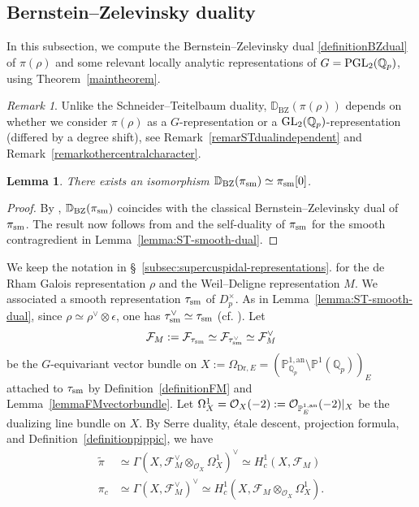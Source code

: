 \documentclass[a4paper,10pt]{amsart}
\theoremstyle{remark}
\newtheorem{remark}[theorem]{Remark}
\theoremstyle{definition}
\theoremstyle{plain}
\newtheorem{lemma}[theorem]{Lemma}
\numberwithin{equation}{section}
\newcommand{\bbD}{{\mathbb D}}
\newcommand{\bbP}{{\mathbb P}}
\newcommand{\bbQ}{{\mathbb Q}}
\newcommand{\calF}{{\mathcal F}}
\newcommand{\calO}{{\mathcal O}}
\newcommand{\an}{{\rm an}}
\newcommand{\GL}{{\rm GL}}
\newcommand{\PGL}{{\rm PGL}}
\newcommand{\sm}{{\rm sm}}
\newcommand{\BZ}{\ensuremath{\mathrm{BZ}}}
\begin{document}
\subsection{Bernstein--Zelevinsky duality}\label{subsectionBZdual}
In this subsection, we compute the Bernstein--Zelevinsky dual \eqref{definitionBZdual} of $\pi(\rho)$ and some relevant locally analytic representations of $G=\PGL_2(\bbQ_p)$, using Theorem~\ref{maintheorem}.
\begin{remark}
	Unlike the Schneider--Teitelbaum duality, $\bbD_{\BZ}(\pi(\rho))$ depends on whether we consider $\pi(\rho)$ as a $G$-representation or a $\GL_2(\bbQ_p)$-representation (differed by a degree shift), see Remark~\ref{remarSTdualindependent} and Remark~\ref{remarkothercentralcharacter}. 
\end{remark}
\begin{lemma}\label{lem:BZ-smooth}
There exists an isomorphism $\bbD_{\BZ}(\pi_{\sm})\simeq\pi_{\sm}[0]$.
\end{lemma}
\begin{proof}
By \cite[Rem.~5.5]{strauch2025bernsteinzelevinskydualitylocallyanalytic}, $\bbD_{\BZ}(\pi_{\sm})$ coincides with the classical Bernstein--Zelevinsky dual of $\pi_{\sm}$. The result now follows from \cite[Rem.~III.3.4]{schneiderStuhler1997representation} and the self-duality of $\pi_{\sm}$ for the smooth contragredient in Lemma~\ref{lemma:ST-smooth-dual}.
\end{proof}
We keep the notation in \S~\ref{subsec:supercuspidal-representations}. for the de Rham Galois representation $\rho$ and the Weil--Deligne representation $M$. We associated a smooth representation $\tau_{\sm}$ of $D_p^{\times}$. As in Lemma~\ref{lemma:ST-smooth-dual}, since $\rho\simeq \rho^{\vee}\otimes \epsilon$, one has $\tau_{\sm}^{\vee}\simeq \tau_{\sm}$ (cf. \cite[\S~56.1, (56.1.4)]{bushnellHenniart2006}). Let \[\calF_M:=\calF_{\tau_{\sm}}\simeq \calF_{\tau_{\sm}^{\vee}}\simeq \calF_{M}^{\vee}\] 
be the $G$-equivariant vector bundle on $X:=\Omega_{\mathrm{Dr},E}=(\mathbb P^{1,\mathrm{an}}_{\bbQ_p}\setminus\mathbb P^1(\bbQ_p))_E$ attached to $\tau_{\rm sm}$ by Definition~\ref{definitionFM} and Lemma~\ref{lemmaFMvectorbundle}. Let $\Omega^1_{X}=\calO_X(-2):=\calO_{\bbP_E^{1,\an}}(-2)|_X$ be the dualizing line bundle on $X$. By Serre duality, \'etale descent, projection formula, and Definition~\ref{definitionpippic}, we have
\begin{equation}\label{equationsheafpic}
	\begin{aligned}
		\widetilde\pi&\simeq\Gamma(X,\calF_M^\vee\otimes_{\calO_X}\Omega_X^1)^{\vee}\simeq  H_c^1(X,\calF_M)\\
		\pi_c&\simeq \Gamma(X,\calF_M^\vee)^{\vee}\simeq H_c^1(X,\calF_M\otimes_{\calO_X}\Omega_X^1).
	\end{aligned}	
\end{equation}
\end{document}
